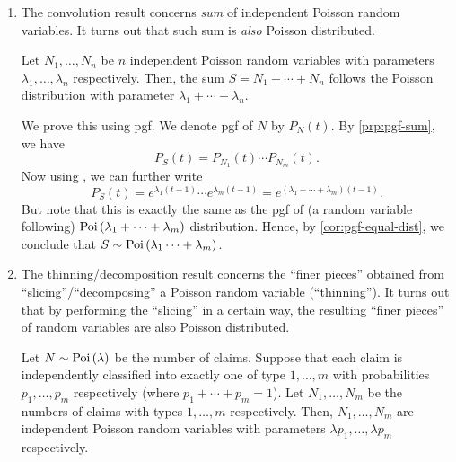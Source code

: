 \begin{enumerate}
\item The convolution result concerns \emph{sum} of independent Poisson random
variables. It turns out that such sum is \emph{also} Poisson distributed.
\begin{theorem}
\label{thm:pois-convolution}
Let \(N_1,\dotsc,N_n\) be \(n\) independent Poisson random variables with
parameters \(\lambda_1,\dotsc,\lambda_n\) respectively. Then, the sum
\(S=N_1+\dotsb+N_n\) follows the Poisson distribution with parameter
\(\lambda_1+\dotsb+\lambda_n\).
\end{theorem}
\begin{pf}
We prove this using pgf. We denote pgf of \(N\) by \(P_N(t)\).  By
\cref{prp:pgf-sum}, we have
\[
P_S(t)=P_{N_1}(t)\dotsb P_{N_m}(t).
\]
Now using , we can further write
\[
P_S(t)=e^{\lambda_1(t-1)}\dotsb e^{\lambda_m(t-1)}
=e^{(\lambda_1+\dotsb+\lambda_m)(t-1)}.
\]
But note that this is exactly the same as the pgf of (a random variable
following) \(\operatorname{Poi}\left(\lambda_1+\dotsb+\lambda_m\right)\) distribution. Hence, by
\cref{cor:pgf-equal-dist}, we conclude that
\(S\sim\operatorname{Poi}\left(\lambda_1\dotsb+\lambda_m\right)\).
\end{pf}
\item The thinning/decomposition result concerns the ``finer pieces'' obtained
from ``slicing''/``decomposing'' a Poisson random variable (``thinning'').  It
turns out that by performing the ``slicing'' in a certain way, the resulting
``finer pieces'' of random variables are also Poisson distributed.

\begin{theorem}
\label{thm:pois-thinning}
Let \(N\sim\operatorname{Poi}\left(\lambda\right)\) be the number of claims. Suppose that each claim is
independently classified into exactly one of type \(1,\dotsc,m\) with
probabilities \(p_1,\dotsc,p_m\) respectively (where \(p_1+\dotsb+p_m=1\)). Let
\(N_1,\dotsc,N_m\) be the numbers of claims with types \(1,\dotsc,m\)
respectively. Then, \(N_1,\dotsc,N_m\) are independent Poisson random variables
with parameters \(\lambda p_1,\dotsc,\lambda p_m\) respectively.
\end{theorem}
\begin{center}
\end{center}
\end{enumerate}
